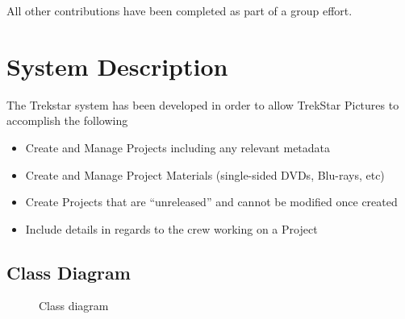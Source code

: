 \documentclass[
  english,
  a4paper,
,tablecaptionabove
]{scrartcl}
\providecommand{\tightlist}{%
  \setlength{\itemsep}{0pt}\setlength{\parskip}{0pt}}
\begin{document}
All other contributions have been completed as part of a group effort.

\newpage

\hypertarget{system-description}{%
\section{System Description}\label{system-description}}

The Trekstar system has been developed in order to allow TrekStar
Pictures to accomplish the following

\begin{itemize}
\tightlist
\item
  Create and Manage Projects including any relevant metadata
\item
  Create and Manage Project Materials (single-sided DVDs, Blu-rays, etc)
\item
  Create Projects that are \enquote{unreleased} and cannot be modified
  once created
\item
  Include details in regards to the crew working on a Project
\end{itemize}

\newpage

\begin{landscape}

\pagestyle{empty}

\hypertarget{class-diagram}{%
\section{Class Diagram}\label{class-diagram}}

\begin{figure}
    \caption{Class diagram} \label{fig:class_diagram}
\end{figure}

\end{landscape}
\end{document}
